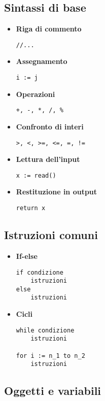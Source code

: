 \subsection{Sintassi di base}

\begin{itemize}
    \item \textbf{Riga di commento}
    \begin{lstlisting}
//...
    \end{lstlisting}
    \item \textbf{Assegnamento}
    \begin{lstlisting}
i := j
    \end{lstlisting}
    \item \textbf{Operazioni}
    \begin{lstlisting}
+, -, *, /, %
    \end{lstlisting}
    \item \textbf{Confronto di interi}
    \begin{lstlisting}
>, <, >=, <=, =, !=
    \end{lstlisting}
    \item \textbf{Lettura dell'input}
    \begin{lstlisting}
x := read()
    \end{lstlisting}
    \item \textbf{Restituzione in output}
    \begin{lstlisting}
return x
    \end{lstlisting}
\end{itemize}

\subsection{Istruzioni comuni}

\begin{itemize}
    \item \textbf{If-else}
    \begin{lstlisting}
if condizione
    istruzioni
else
    istruzioni
    \end{lstlisting}
    \item \textbf{Cicli}
    \begin{lstlisting}
while condizione
    istruzioni

for i := n_1 to n_2
    istruzioni
    \end{lstlisting}
\end{itemize}

\subsection{Oggetti e variabili}

